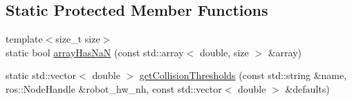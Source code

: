 \subsection*{Static Protected Member Functions}
\begin{DoxyCompactItemize}
\item 
{\footnotesize template$<$size\+\_\+t size$>$ }\\static bool \hyperlink{classfranka__hw_1_1_franka_h_w_a6adcd4d0cf60dd255bfea0d80791fcc7}{array\+Has\+NaN} (const std\+::array$<$ double, size $>$ \&array)
\item 
static std\+::vector$<$ double $>$ \hyperlink{classfranka__hw_1_1_franka_h_w_a2f811d66ca087ad8ca387f7767e1df5f}{get\+Collision\+Thresholds} (const std\+::string \&name, ros\+::\+Node\+Handle \&robot\+\_\+hw\+\_\+nh, const std\+::vector$<$ double $>$ \&defaults)
\end{DoxyCompactItemize}
